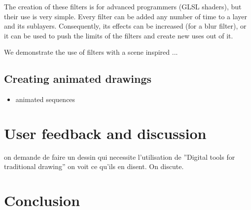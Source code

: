\documentclass{sigchi}
\begin{document}
The creation of these filters is for advanced programmers (GLSL
shaders), but their use is very simple. Every filter can be added any
number of time to a layer and its sublayers. Consequently, its effects
can be increased (for a blur filter), or it can be used to push the
limits of the filters and create new uses out of it. 

We demonstrate the use of filters with a scene inspired ...




\subsection{Creating animated drawings}
\begin{itemize}
  \item animated sequences 
\end{itemize}

\section{User feedback and discussion}

on demande de faire un dessin qui necessite l'utilisation de ''Digital tools for traditional drawing''
on voit ce qu'ils en disent. On discute.


\section{Conclusion}

 
\balance



\end{document}
